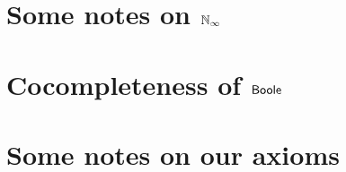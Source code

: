 \documentclass{../util/zariski}
\begin{document}
\section{Some notes on $\mathbb{N}_{\infty}$}


\section{Cocompleteness of $\mathsf{Boole}$}

\section{Some notes on our axioms}
\label{NotesOnAxioms}


%






%
%
%
%
%
%
%
%
%
%
%
%
%
%
%
%
%
%
%
\printbibliography
%
\end{document}
